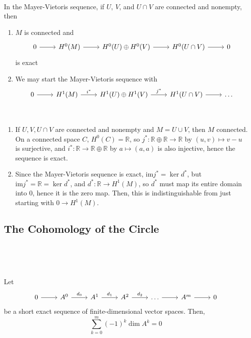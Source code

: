 \documentclass{article}
\begin{document}
\begin{proposition}
\

In the Mayer-Vietoris sequence, if $U$, $V$, and $U \cap V$ are connected and nonempty, then

\begin{enumerate}
  \item $M$ is connected and \[\begin{tikzcd}
    0 & H^0(M) & H^0(U) \oplus H^0(V) & H^0(U \cap V) & 0
    \arrow[from=1-1, to=1-2]
    \arrow[from=1-2, to=1-3]
    \arrow[from=1-3, to=1-4]
    \arrow[from=1-4, to=1-5]
  \end{tikzcd}\]is exact
  \item We may start the Mayer-Vietoris sequence with \[\begin{tikzcd}
    0 & H^1(M) & H^1(U) \oplus H^1(V) & H^1(U \cap V) & \dots
    \arrow[from=1-1, to=1-2]
    \arrow[from=1-2, to=1-3, "i^*"]
    \arrow[from=1-3, to=1-4, "j^*"]
    \arrow[from=1-4, to=1-5]
  \end{tikzcd}\]
\end{enumerate}
\end{proposition}

\begin{customproof}
\


\begin{enumerate}
  \item If $U, V, U \cap V$ are connected and nonempty and $M = U \cup V$, then $M$ connected. On a connected space $C$, $H^0(C) = \mathbb{R}$, so $j^*: \mathbb{R} \oplus \mathbb{R} \to \mathbb{R}$ by $(u,v) \mapsto v-u$ is surjective, and $i^*: \mathbb{R} \to \mathbb{R} \oplus \mathbb{R}$ by $a \mapsto (a,a)$ is also injective, hence the sequence is exact.
  \item Since the Mayer-Vietoris sequence is exact, $\text{im} j^* = \ker d^*$, but $\text{im} j^* = \mathbb{R} = \ker d^*$, and $d^*: \mathbb{R} \to H^1(M)$, so $d^*$ must map its entire domain into $0$, hence it is the zero map. Then, this is indistinguishable from just starting with $0 \to H^1(M)$.
\end{enumerate}
\end{customproof}

\subsection{The Cohomology of the Circle}
\

\begin{proposition}
\

Let \[\begin{tikzcd}
  0 & A^0 & A^1 & A^2 & \dots & A^m & 0
  \arrow[from=1-1, to=1-2]
  \arrow[from=1-2, to=1-3, "d_0"]
  \arrow[from=1-3, to=1-4, "d_1"]
  \arrow[from=1-4, to=1-5, "d_2"]
  \arrow[from=1-5, to=1-6]
  \arrow[from=1-6, to=1-7]
\end{tikzcd}\]be a short exact sequence of finite-dimensional vector spaces. Then, $$\sum_{k=0}^m (-1)^k \dim A^k = 0$$
\end{proposition}
\end{document}
